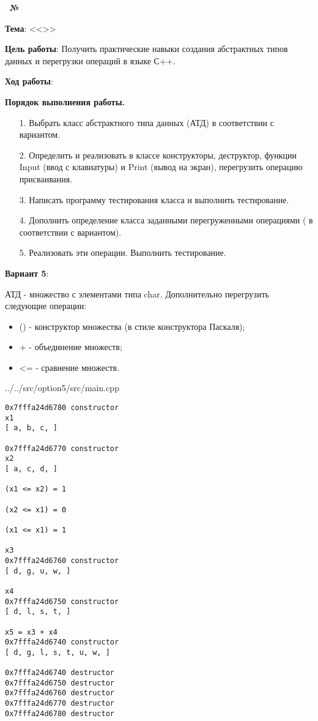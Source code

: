 \begin{center}
    \textbf{\titlePageWorkType~№\titlePageWorkNumber}
\end{center}

\textbf{Тема}: <<\titlePageTopic>>

\textbf{Цель работы}: Получить практические навыки создания абстрактных типов данных и перегрузки операций в языке С++.

\begin{center}
    \textbf{Ход работы}:
\end{center}

\textbf{Порядок выполнения работы.}

\begin{enumerate}
    \item [1.] Выбрать класс абстрактного типа данных (АТД) в соответствии с вариантом.
    \item [2.] Определить и реализовать в классе конструкторы, деструктор, функции Input (ввод с клавиатуры) и Print (вывод на экран), перегрузить операцию присваивания. 
    \item [3.] Написать программу тестирования класса и выполнить тестирование. 
    \item [4.] Дополнить определение класса заданными перегруженными операциями ( в соответствии с вариантом).
    \item [5.] Реализовать эти операции. Выполнить тестирование.
\end{enumerate}

\begin{center}
    \textbf{Вариант 5}:
\end{center}

АТД - множество с элементами типа char.
Дополнительно перегрузить следующие операции:
\begin{itemize}
    \item () - конструктор множества (в стиле конструктора Паскаля);
    \item + - объединение множеств;
    \item <= - сравнение множеств.
\end{itemize}


{../../src/option5/src/main.cpp}

\begin{lstlisting}[language=Out,]
0x7fffa24d6780 constructor
x1
[ a, b, c, ]

0x7fffa24d6770 constructor
x2
[ a, c, d, ]

(x1 <= x2) = 1

(x2 <= x1) = 0

(x1 <= x1) = 1

x3
0x7fffa24d6760 constructor
[ d, g, u, w, ]

x4
0x7fffa24d6750 constructor
[ d, l, s, t, ]

x5 = x3 + x4
0x7fffa24d6740 constructor
[ d, g, l, s, t, u, w, ]

0x7fffa24d6740 destructor
0x7fffa24d6750 destructor
0x7fffa24d6760 destructor
0x7fffa24d6770 destructor
0x7fffa24d6780 destructor
\end{lstlisting}
